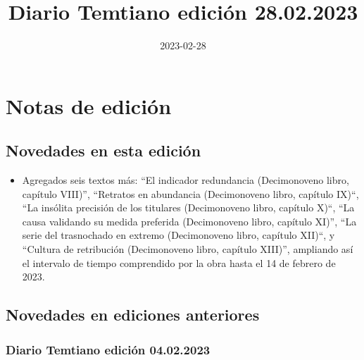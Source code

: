 \documentclass[
]{book}
\title{Diario Temtiano edición 28.02.2023}
\author{}
\date{\vspace{-2.5em}2023-02-28}
\providecommand{\tightlist}{%
  \setlength{\itemsep}{0pt}\setlength{\parskip}{0pt}}
\begin{document}
\maketitle

{
\setcounter{tocdepth}{1}
\tableofcontents
}
\hypertarget{notas-de-ediciuxf3n}{%
\chapter*{Notas de edición}\label{notas-de-ediciuxf3n}}

\hypertarget{novedades-en-esta-ediciuxf3n}{%
\section*{Novedades en esta edición}\label{novedades-en-esta-ediciuxf3n}}

\begin{itemize}
\tightlist
\item
  Agregados seis textos más: ``El indicador redundancia (Decimonoveno libro, capítulo VIII)'', ``Retratos en abundancia (Decimonoveno libro, capítulo IX)``, ``La insólita precisión de los titulares (Decimonoveno libro, capítulo X)``, ``La causa validando su medida preferida (Decimonoveno libro, capítulo XI)'', ``La serie del trasnochado en extremo (Decimonoveno libro, capítulo XII)``, y ``Cultura de retribución (Decimonoveno libro, capítulo XIII)'', ampliando así el intervalo de tiempo comprendido por la obra hasta el 14 de febrero de 2023.
\end{itemize}

\hypertarget{novedades-en-ediciones-anteriores}{%
\section*{Novedades en ediciones anteriores}\label{novedades-en-ediciones-anteriores}}

\hypertarget{diario-temtiano-ediciuxf3n-04.02.2023}{%
\subsection*{Diario Temtiano edición 04.02.2023}\label{diario-temtiano-ediciuxf3n-04.02.2023}}
\end{document}
